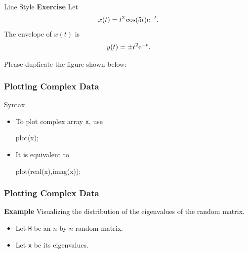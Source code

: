 \documentclass{beamer}  %
\begin{document}
\begin{frame}{Line Style}
\textbf{Exercise}
Let
\begin{equation}
    x(t) = t^2 \cos(5t) \textrm{e}^{-t}.
\end{equation}\pause
The envelope of $x(t)$ is
\begin{equation}
    y(t) = \pm t^2 \textrm{e}^{-t}.
\end{equation}\pause

Please duplicate the figure shown below:
\begin{figure}[htb]
        \centering
\end{figure}

\end{frame}
\begin{frame}[fragile]
\frametitle{Plotting Complex Data}

\begin{block}{Syntax}
\begin{itemize}[<+->]
    \item To plot complex array \texttt{x}, use
          \begin{matlabcodebeamer}[frame=none]
          plot(x);
          \end{matlabcodebeamer}
    \item It is equivalent to
          \begin{matlabcodebeamer}[frame=none]
          plot(real(x),imag(x));
          \end{matlabcodebeamer}
\end{itemize}
\end{block}

\end{frame}
\begin{frame}[fragile]
\frametitle{Plotting Complex Data}
\textbf{Example} 
Visualizing the distribution of the eigenvalues of the random matrix. \pause
\begin{itemize}
    \item Let \texttt{H} be an $n$-by-$n$ random matrix.
    \item Let \texttt{x} be its eigenvalues.
\end{itemize}

\pause
\begin{figure}[htb]
        \centering
\end{figure}

\end{frame}
\end{document}
